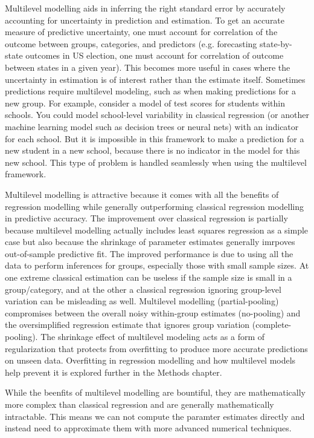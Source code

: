 Multilevel modelling aids in inferring the right standard error by accurately accounting for uncertainty in prediction and estimation. To get an accurate measure of predictive uncertainty, one must account for correlation of the outcome between groups, categories, and predictors (e.g. forecasting state-by-state outcomes in US election, one must account for correlation of outcome between states in a given year). This becomes more useful in cases where the uncertainty in estimation is of interest rather than the estimate itself. Sometimes predictions require multilevel modeling, such as when making predictions for a new group. For example, consider a model of test scores for students within schools. You could model school-level variability in classical regression (or another machine learning model such as decision trees or neural nets) with an indicator for each school. But it is impossible in this framework to make a prediction for a new student in a new school, because there is no indicator in the model for this new school. This type of problem is handled seamlessly when using the multilevel framework.

Multilevel modelling is attractive because it comes with all the benefits of regression modelling while generally outperforming classical regression modelling in predictive accuracy. The improvement over classical regression is partially because multilevel modelling actually includes least squares regression as a simple case but also because the shrinkage of parameter estimates generally imrpoves out-of-sample predictive fit. The improved performance is due to using all the data to perform inferences for groups, especially those with small sample sizes. At one extreme classical estimation can be useless if the sample size is small in a group/category, and at the other a classical regression ignoring group-level variation can be misleading as well. Multilevel modelling (partial-pooling) compromises between the overall noisy within-group estimates (no-pooling) and the oversimplified regression estimate that ignores group variation (complete-pooling). The shrinkage effect of multilevel modeling acts as a form of regularization that protects from overfitting to produce more accurate predictions on unseen data. Overfitting in regression modelling and how multilevel models help prevent it is explored further in the Methods chapter.

While the beenfits of multilevel modelling are bountiful, they are mathematically more complex than classical regression and are generally mathematically intractable. This means we can not compute the paramter estimates directly and instead need to approximate them with more advanced numerical techniques.

